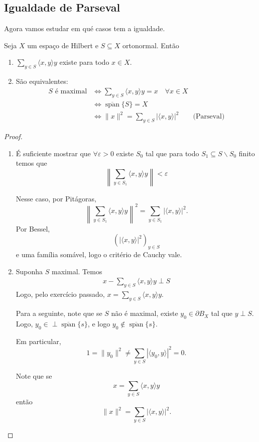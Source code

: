 \documentclass[portuguese]{article}
\theoremstyle{definition}
\begin{document}
\subsection{Igualdade de Parseval}
Agora vamos estudar em qué casos tem a igualdade.
\begin{teo}
	Seja $X$ um espaço de Hilbert e $S\subseteq X$ ortonormal. Então
	\begin{enumerate}
		\item $\sum_{y\in S}\langle x,y\rangle y$ existe para todo $x\in X$.
		\item São equivalentes:
		\begin{align*}
			S\text{ é maximal}&\iff \sum_{y\in S}\langle x,y\rangle y=x\quad\forall x\in X\\
			&\iff\overline{\operatorname{span}}\{S\}=X\\
			&\iff\|x\|^2=\sum_{y\in S}|\langle x,y\rangle|^2\qquad\text{(Parseval)}
		\end{align*}
	\end{enumerate}
\end{teo}
\begin{proof}
	\begin{enumerate}
		\item \begin{exer*}
		É suficiente mostrar que $\forall\varepsilon>0$ existe $S_0$ tal que para todo $S_1\subseteq S\backslash S_0$ finito temos que
		\[\left\|\sum_{y\in S_1}\langle x,y\rangle y\right\|<\varepsilon\]
	\end{exer*}
	Nesse caso, por Pitágoras,
	\[\left\|\sum_{y\in S_1}\langle x,y\rangle y\right\|^2=\sum_{y\in S_1}|\langle x,y\rangle|^2.\]
	Por Bessel,
	\[(|\langle x,y\rangle|^2)_{y\in S}\]
	e uma família somável, logo o critério de Cauchy vale.
	\item Suponha $S$ maximal. Temos 
	\begin{align*}
		x-\sum_{y\in S}\langle x,y\rangle y\perp S
	\end{align*}
	Logo, pelo exercício passado, $x=\sum_{y\in S}\langle x,y\rangle y$.
	
	Para a seguinte, note que se $S$ não é maximal, existe $y_0\in\partial B_X$ tal que $y\perp S$. Logo, $y_0\in \perp\overline{\operatorname{span}}\{s\}$, e logo $y_0\notin\overline{\operatorname{span}}\{s\}$.
	
	Em particular, 
	\[1=\|y_0\|^2\neq\sum_{y\in S}|\langle y_0,y\rangle|^2=0.\]
	
	Note que se
	\[x=\sum_{y\in S}\langle x,y\rangle y\]
	então 
	\[\|x\|^2=\sum_{y\in S}|\langle x,y\rangle|^2.\]
	\end{enumerate}
\end{proof}
\end{document}
